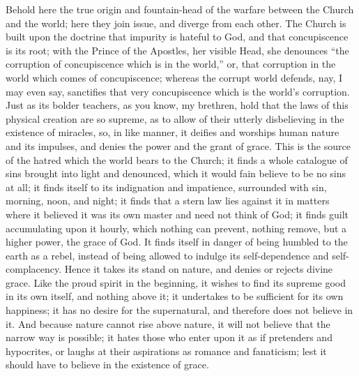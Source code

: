 Behold here the true origin and fountain-head of the warfare
between the Church and the world; here they join issue, and diverge
from each other. The Church is built upon the doctrine that impurity
is hateful to God, and that concupiscence is its root; with the Prince
of the Apostles, her visible Head, she denounces ``the corruption
of concupiscence which is in the world,'' or, that corruption in
the world which comes of concupiscence; whereas the corrupt world
defends, nay, I may even say, sanctifies that very concupiscence which
is the world's corruption. Just as its bolder teachers, as you know,
my brethren, hold that the laws of this physical creation are so
supreme, as to allow of their utterly disbelieving in the existence of
miracles, so, in like manner, it deifies and worships human nature and
its impulses, and denies the power and the grant of grace. This is the
source of the hatred which the world bears to the Church; it finds a
whole catalogue of sins brought into light and denounced, which it
would fain believe to be no sins at all; it finds itself to its
indignation and impatience, surrounded with sin, morning, noon, and
night; it finds that a stern law lies against it in matters where it
believed it was its own master and need not think of God; it finds
guilt accumulating upon it hourly, which nothing can prevent, nothing
remove, but a higher power, the grace of God. It finds itself in
danger of being humbled to the earth as a rebel, instead of being
allowed to indulge its self-dependence and self-complacency. Hence it
takes its stand on nature, and denies or rejects divine grace. Like
the proud spirit in the beginning, it wishes to find its supreme good
in its own itself, and nothing above it; it undertakes to be
sufficient for its own happiness; it has no desire for the
supernatural, and therefore does not believe in it. And because nature
cannot rise above nature, it will not believe that the narrow way is
possible; it hates those who enter upon it as if pretenders and
hypocrites, or laughs at their aspirations as romance and fanaticism;
lest it should have to believe in the existence of grace.

